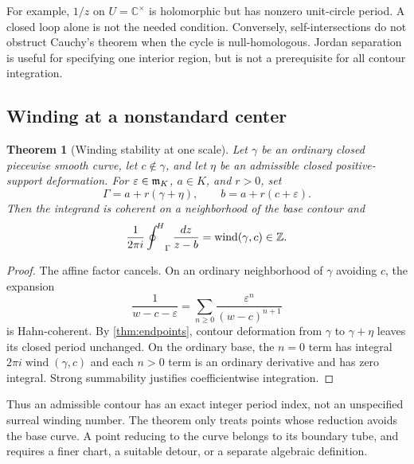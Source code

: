 \documentclass[11pt,letterpaper]{article}
\newtheorem{theorem}{Theorem}[section]
\theoremstyle{definition}
\theoremstyle{remark}
\newcommand{\C}{\mathbb C}\newcommand{\R}{\mathbb R}\newcommand{\Q}{\mathbb Q}\newcommand{\Z}{\mathbb Z}\newcommand{\N}{\mathbb N}
\newcommand{\wind}{\operatorname{wind}}\newcommand{\Ind}{\operatorname{Ind}}\newcommand{\id}{\operatorname{id}}
\numberwithin{equation}{section}
\begin{document}
For example, $1/z$ on $U=\C^\times$ is holomorphic but has nonzero unit-circle period. A closed loop alone is not the needed condition. Conversely, self-intersections do not obstruct Cauchy's theorem when the cycle is null-homologous. Jordan separation is useful for specifying one interior region, but is not a prerequisite for all contour integration.

\subsection{Winding at a nonstandard center}
\begin{theorem}[Winding stability at one scale]\label{thm:winding}
Let $\gamma$ be an ordinary closed piecewise smooth curve, let $c\notin\gamma$, and let $\eta$ be an admissible closed positive-support deformation. For $\varepsilon\in\mathfrak m_K$, $a\in K$, and $r>0$, set
\[
 \Gamma=a+r(\gamma+\eta),\qquad b=a+r(c+\varepsilon).
\]
Then the integrand is coherent on a neighborhood of the base contour and
\begin{equation}\label{eq:winding}
 \frac1{2\pi i}\HCoint_\Gamma\frac{dz}{z-b}
       =\wind(\gamma,c)\in\Z.
\end{equation}
\end{theorem}
\begin{proof}
The affine factor cancels. On an ordinary neighborhood of $\gamma$ avoiding $c$, the expansion
\[
 \frac1{w-c-\varepsilon}
   =\sum_{n\ge0}\frac{\varepsilon^n}{(w-c)^{n+1}}
\]
is Hahn-coherent. By \cref{thm:endpoints}, contour deformation from $\gamma$ to $\gamma+\eta$ leaves its closed period unchanged. On the ordinary base, the $n=0$ term has integral $2\pi i\wind(\gamma,c)$ and each $n>0$ term is an ordinary derivative and has zero integral. Strong summability justifies coefficientwise integration.
\end{proof}

Thus an admissible contour has an exact integer period index, not an unspecified surreal winding number. The theorem only treats points whose reduction avoids the base curve. A point reducing to the curve belongs to its boundary tube, and requires a finer chart, a suitable detour, or a separate algebraic definition.
\end{document}
